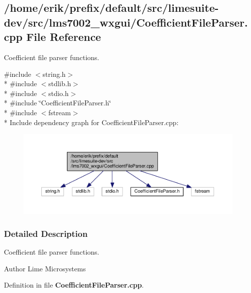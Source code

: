 \subsection{/home/erik/prefix/default/src/limesuite-\/dev/src/lms7002\+\_\+wxgui/\+Coefficient\+File\+Parser.cpp File Reference}
\label{CoefficientFileParser_8cpp}


Coefficient file parser functions.  


{\ttfamily \#include $<$string.\+h$>$}\\*
{\ttfamily \#include $<$stdlib.\+h$>$}\\*
{\ttfamily \#include $<$stdio.\+h$>$}\\*
{\ttfamily \#include \char`\"{}Coefficient\+File\+Parser.\+h\char`\"{}}\\*
{\ttfamily \#include $<$fstream$>$}\\*
Include dependency graph for Coefficient\+File\+Parser.\+cpp\+:
\nopagebreak
\begin{figure}[H]
\begin{center}
\leavevmode
\includegraphics[width=350pt]{d2/d22/CoefficientFileParser_8cpp__incl}
\end{center}
\end{figure}


\subsubsection{Detailed Description}
Coefficient file parser functions. 

\begin{DoxyAuthor}{Author}
Lime Microsystems 
\end{DoxyAuthor}


Definition in file {\bf Coefficient\+File\+Parser.\+cpp}.


